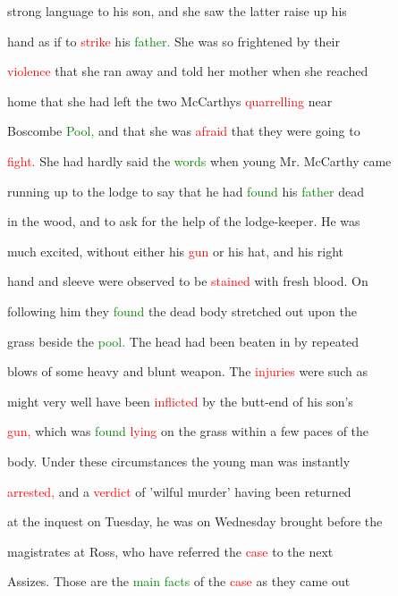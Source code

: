  strong language to his son, and she saw the latter raise up his

 hand as if to \textcolor{red}{strike} his \textcolor{green}{father.} She was so \textcolor{BurntOrange}{frightened} by their

 \textcolor{red}{violence} that she ran away and told her \textcolor{BurntOrange}{mother} when she reached

 home that she had left the two McCarthys \textcolor{red}{quarrelling} near

 Boscombe \textcolor{green}{Pool,} and that she was \textcolor{red}{afraid} that they were going to

 \textcolor{red}{fight.} She had hardly said the \textcolor{green}{words} when \textcolor{BurntOrange}{young} Mr. McCarthy came

 running up to the lodge to say that he had \textcolor{green}{found} his \textcolor{green}{father} dead

 in the wood, and to ask for the help of the lodge-keeper. He was

 much \textcolor{BurntOrange}{excited,} without either his \textcolor{red}{gun} or his hat, and his right

 hand and sleeve were observed to be \textcolor{red}{stained} with fresh blood. On

 following him they \textcolor{green}{found} the dead body stretched out upon the

 grass beside the \textcolor{green}{pool.} The head had been beaten in by repeated

 blows of some heavy and blunt weapon. The \textcolor{red}{injuries} were such as

 might very well have been \textcolor{red}{inflicted} by the butt-end of his son's

 \textcolor{red}{gun,} which was \textcolor{green}{found} \textcolor{red}{lying} on the grass within a few paces of the

 body. Under these circumstances the \textcolor{BurntOrange}{young} man was instantly

 \textcolor{red}{arrested,} and a \textcolor{red}{verdict} of 'wilful \textcolor{BurntOrange}{murder'} having been returned

 at the inquest on Tuesday, he was on Wednesday brought before the

 magistrates at Ross, who have referred the \textcolor{red}{case} to the next

 Assizes. Those are the \textcolor{green}{main} \textcolor{green}{facts} of the \textcolor{red}{case} as they came out

